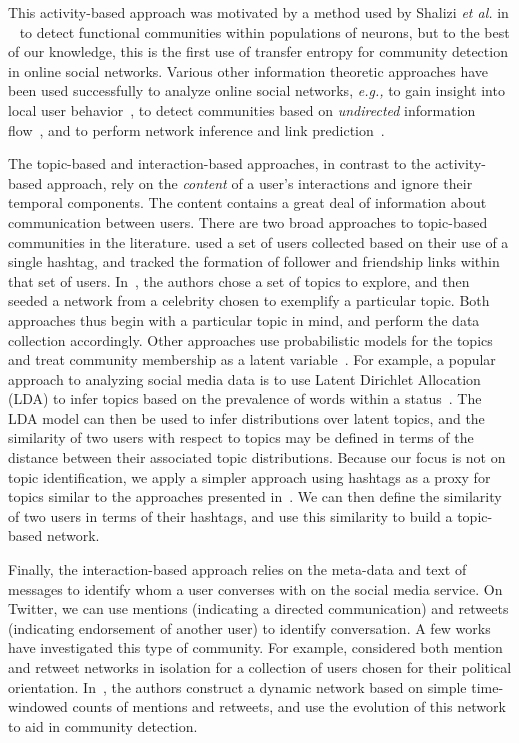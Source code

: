 This activity-based approach was motivated by a method used by Shalizi \emph{et al.} in ~\cite{shalizi2007discovering} to detect functional communities within populations of neurons, but to the best of our knowledge, this is the first use of transfer entropy for community detection in online social networks. Various other information theoretic approaches have been used successfully to analyze online social networks, \emph{e.g.,} to gain insight into local user behavior~\cite{darmon2013understanding}, to detect communities based on \emph{undirected} information flow~\cite{darmon2013detecting}, and to perform network inference and link prediction~\cite{ver2012information}.


The topic-based and interaction-based approaches, in contrast to the activity-based approach, rely on the \emph{content} of a user's interactions and ignore their temporal components. The content contains a great deal of information about communication between users.
There are two broad approaches to topic-based communities in the literature. \cite{rossi2012conversation} used a set of users collected based on their use of a single hashtag, and tracked the formation of follower and friendship links within that set of users. In~\cite{lim2012following}, the authors chose a set of topics to explore, and then seeded a network from a celebrity chosen to exemplify a particular topic. Both approaches thus begin with a particular topic in mind, and perform the data collection accordingly. Other approaches use probabilistic models for the topics and treat community membership as a latent variable~\cite{yin2012latent}.
For example, a popular approach to analyzing social media data is to use Latent Dirichlet Allocation (LDA) to infer topics based on the prevalence of words within a status~\cite{zhao2011comparing,michelson2010discovering}. The LDA model can then be used to infer distributions over latent topics, and the similarity of two users with respect to topics may be defined in terms of the distance between their associated topic distributions. Because our focus is not on topic identification, we apply a simpler approach using hashtags as a proxy for topics similar to the approaches presented in~\cite{becker2011beyond,tsur2012s}. We can then define the similarity of two users in terms of their hashtags, and use this similarity to build a topic-based network.

Finally, the interaction-based approach relies on the meta-data and text of messages to identify whom a user converses with on the social media service. On Twitter, we can use mentions (indicating a directed communication) and retweets (indicating endorsement of another user) to identify conversation. 
A few works have investigated this type of community. For example, \cite{conover2011political} considered both mention and retweet networks in isolation for a collection of users chosen for their political orientation. In~\cite{deitrick2013mutually}, the authors construct a dynamic network based on simple time-windowed counts of mentions and retweets, and use the evolution of this network to aid in community detection.

